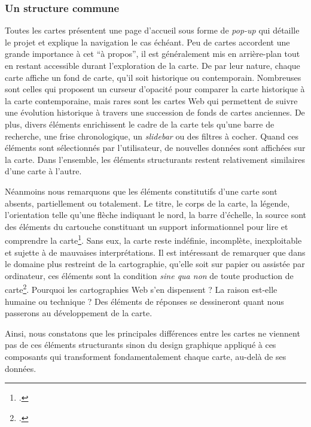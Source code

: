 \subsubsection{Un structure commune}
Toutes les cartes présentent une page d'accueil sous forme de \textit{pop-up} qui détaille le projet et explique la navigation le cas échéant. Peu de cartes accordent une grande importance à cet \enquote{à propos}, il est généralement mis en arrière-plan tout en restant accessible durant l'exploration de la carte. De par leur nature, chaque carte affiche un fond de carte, qu'il soit historique ou contemporain. Nombreuses sont celles qui proposent un curseur d'opacité pour comparer la carte historique à la carte contemporaine, mais rares sont les cartes Web qui permettent de suivre une évolution historique à travers une succession de fonds de cartes anciennes. De plus, divers éléments enrichissent le cadre de la carte tels qu'une barre de recherche, une frise chronologique, un \textit{slidebar} ou des filtres à cocher. Quand ces éléments sont sélectionnés par l'utilisateur, de nouvelles données sont affichées sur la carte. Dans l'ensemble, les éléments structurants restent relativement similaires d'une carte à l'autre. 

Néanmoins nous remarquons que les éléments constitutifs d'une carte sont absents, partiellement ou totalement. Le titre, le corps de la carte, la légende, l'orientation telle qu'une flèche indiquant le nord, la barre d’échelle, la source sont des éléments du cartouche constituant un support informationnel pour lire et comprendre la carte\footcite{LAMBERTboite2016, LEFEBVREproduction1974}. Sans eux, la carte reste indéfinie, incomplète, inexploitable et sujette à de mauvaises interprétations. Il est intéressant de remarquer que dans le domaine plus restreint de la cartographie, qu'elle soit sur papier ou assistée par ordinateur, ces éléments sont la condition \textit{sine qua non} de toute production de carte\footcite{COSGROVECultural2008}. Pourquoi les cartographies Web s'en dispensent ? La raison est-elle humaine ou technique ? Des éléments de réponses se dessineront quant nous passerons au développement de la carte. 

Ainsi, nous constatons que les principales différences entre les cartes ne viennent pas de ces éléments structurants sinon du design graphique appliqué à ces composants qui transforment fondamentalement chaque carte, au-delà de ses données.

